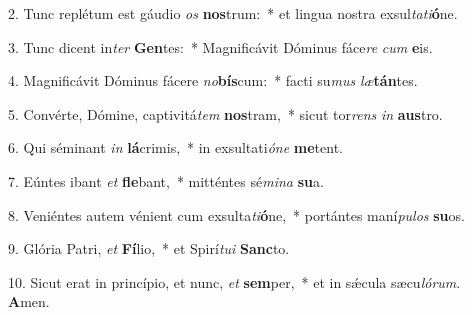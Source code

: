 2. Tunc replétum est gáudio \textit{os} \textbf{nos}trum:~*  et lingua nostra exsul\textit{ta}\textit{ti}\textbf{ó}ne.\

3. Tunc dicent in\textit{ter} \textbf{Gen}tes:~*  Magnificávit Dóminus fáce\textit{re} \textit{cum} \textbf{e}is.\

4. Magnificávit Dóminus fácere \textit{no}\textbf{bís}cum:~*  facti su\textit{mus} \textit{læ}\textbf{tán}tes.\

5. Convérte, Dómine, captivitá\textit{tem} \textbf{nos}tram,~*  sicut tor\textit{rens} \textit{in} \textbf{aus}tro.\

6. Qui séminant \textit{in} \textbf{lá}crimis,~*  in exsultati\textit{ó}\textit{ne} \textbf{me}tent.\

7. Eúntes ibant \textit{et} \textbf{fle}bant,~*  mitténtes sé\textit{mi}\textit{na} \textbf{su}a.\

8. Veniéntes autem vénient cum exsulta\textit{ti}\textbf{ó}ne,~*  portántes maní\textit{pu}\textit{los} \textbf{su}os.\

9. Glória Patri, \textit{et} \textbf{Fí}lio,~*  et Spirí\textit{tu}\textit{i} \textbf{Sanc}to.\

10. Sicut erat in princípio, et nunc, \textit{et} \textbf{sem}per,~*  et in sǽcula sæcu\textit{ló}\textit{rum}. \textbf{A}men.\

